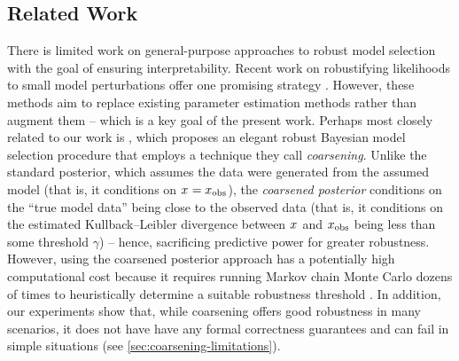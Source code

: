 \subsection{Related Work} \label{sec:related-work}



There is limited work on general-purpose approaches to robust model selection with the goal
of ensuring interpretability.
Recent work on robustifying likelihoods to small model perturbations offer one promising 
strategy \citep{Chakraborty:2023,Dewaskar:2023,Wu:2024} .
However, these methods aim to replace existing parameter estimation methods rather than augment them
-- which is a key goal of the present work.
Perhaps most closely related to our work is \citet{Miller:2019}, which proposes an elegant robust Bayesian model selection
procedure that employs a technique they call \emph{coarsening}.
Unlike the standard posterior, which assumes the data were generated from the assumed model (that is, it conditions on $x_{} = x_{\mathrm{obs}}$), the \emph{coarsened posterior} conditions on the ``true model data'' being close to the observed data
(that is, it conditions on the estimated Kullback--Leibler divergence between $x_{}$ and $x_{\mathrm{obs}}$ being less than some threshold $\gamma$) -- hence, sacrificing predictive power for greater robustness.
However, using the coarsened posterior approach has a potentially high computational cost because
it requires running Markov chain Monte Carlo dozens of times to heuristically determine a suitable robustness threshold \citep{Miller:2019,Xue:2024}.
In addition, our experiments show that, while coarsening offers good robustness in many scenarios, it does not have have any formal correctness guarantees
and can fail in simple situations (see \cref{sec:coarsening-limitations}). 

